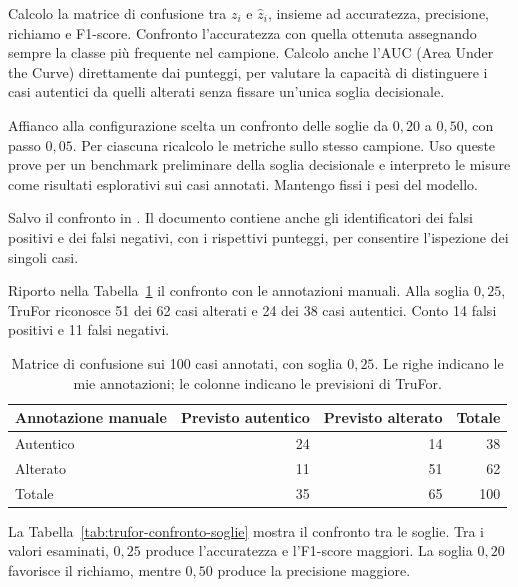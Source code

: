 Calcolo la matrice di confusione tra $z_i$ e $\widehat{z}_i$, insieme ad accuratezza, precisione, richiamo e F1-score. Confronto l'accuratezza con quella ottenuta assegnando sempre la classe più frequente nel campione. Calcolo anche l’AUC (Area Under the Curve) direttamente dai punteggi, per valutare la capacità di distinguere i casi autentici da quelli alterati senza fissare un’unica soglia decisionale.

Affianco alla configurazione scelta un confronto delle soglie da $0{,}20$ a $0{,}50$, con passo $0{,}05$. Per ciascuna ricalcolo le metriche sullo stesso campione. Uso queste prove per un benchmark preliminare della soglia decisionale e interpreto le misure come risultati esplorativi sui casi annotati. Mantengo fissi i pesi del modello.

Salvo il confronto in . Il documento contiene anche gli identificatori dei falsi positivi e dei falsi negativi, con i rispettivi punteggi, per consentire l'ispezione dei singoli casi.

Riporto nella Tabella~\ref{tab:trufor-confusione} il confronto con le annotazioni manuali. Alla soglia $0{,}25$, TruFor riconosce 51 dei 62 casi alterati e 24 dei 38 casi autentici. Conto 14 falsi positivi e 11 falsi negativi.

\begin{table}[htbp]
    \centering
    \small
    \caption{Matrice di confusione sui 100 casi annotati, con soglia $0{,}25$. Le righe indicano le mie annotazioni; le colonne indicano le previsioni di TruFor.}
    \label{tab:trufor-confusione}
    \begin{tabular}{@{}lrrr@{}}
        \toprule
        Annotazione manuale & Previsto autentico & Previsto alterato & Totale \\
        \midrule
        Autentico & 24 & 14 & 38 \\
        Alterato & 11 & 51 & 62 \\
        \midrule
        Totale & 35 & 65 & 100 \\
        \bottomrule
    \end{tabular}
\end{table}

La Tabella~\ref{tab:trufor-confronto-soglie} mostra il confronto tra le soglie. Tra i valori esaminati, $0{,}25$ produce l'accuratezza e l'F1-score maggiori. La soglia $0{,}20$ favorisce il richiamo, mentre $0{,}50$ produce la precisione maggiore.


